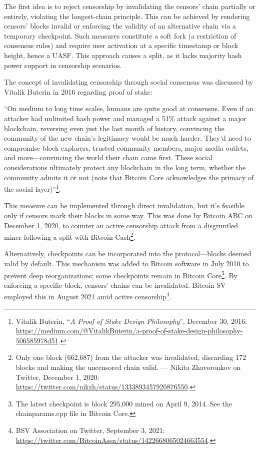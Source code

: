 \documentclass[
  a5paper,
  smalldemyvopaper,10pt,twoside,onecolumn,openright,extrafontsizes,hidelinks]{memoir}
\begin{document}
The first idea is to reject censorship by invalidating the censors'
chain partially or entirely, violating the longest-chain principle. This
can be achieved by rendering censors' blocks invalid or enforcing the
validity of an alternative chain via a temporary checkpoint. Such
measures constitute a soft fork (a restriction of consensus rules) and
require user activation at a specific timestamp or block height, hence a
UASF. This approach causes a split, as it lacks majority hash power
support in censorship scenarios.

The concept of invalidating censorship through social consensus was
discussed by Vitalik Buterin in 2016 regarding proof of stake:

``On medium to long time scales, humans are quite good at consensus.
Even if an attacker had unlimited hash power and managed a 51\% attack
against a major blockchain, reversing even just the last month of
history, convincing the community of the new chain's legitimacy would be
much harder. They'd need to compromise block explorers, trusted
community members, major media outlets, and more---convincing the world
their chain came first. These social considerations ultimately protect
any blockchain in the long term, whether the community admits it or not
(note that Bitcoin Core acknowledges the primacy of the social
layer)''\footnote{Vitalik Buterin, ``\emph{A Proof of Stake Design
  Philosophy}'', December 30, 2016:
  \url{https://medium.com/@VitalikButerin/a-proof-of-stake-design-philosophy-506585978d51}.}.

This measure can be implemented through direct invalidation, but it's
feasible only if censors mark their blocks in some way. This was done by
Bitcoin ABC on December 1, 2020, to counter an active censorship attack
from a disgruntled miner following a split with Bitcoin Cash\footnote{Only
  one block (662,687) from the attacker was invalidated, discarding 172
  blocks and making the uncensored chain valid. --- Nikita Zhavoronkov
  on Twitter, December 1, 2020:
  \url{https://twitter.com/nikzh/status/1333893457920876550}.}.

Alternatively, checkpoints can be incorporated into the
protocol---blocks deemed valid by default. This mechanism was added to
Bitcoin software in July 2010 to prevent deep reorganizations; some
checkpoints remain in Bitcoin Core\footnote{The latest checkpoint is
  block 295,000 mined on April 9, 2014. See the chainparams.cpp file in
  Bitcoin Core.}. By enforcing a specific block, censors' chains can be
invalidated. Bitcoin SV employed this in August 2021 amid active
censorship\footnote{BSV Association on Twitter, September 3, 2021:
  \url{https://twitter.com/BitcoinAssn/status/1422668065024663554}.}.
\end{document}

